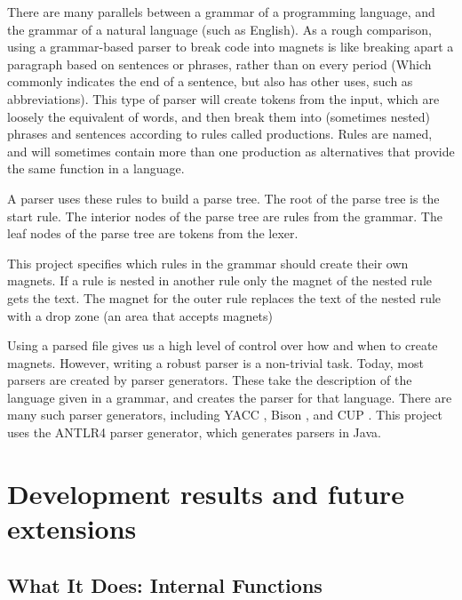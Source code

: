 \documentclass[letter,10pt]{article}
\begin{document}
There are many parallels between a grammar of a programming language, 
and the grammar of a natural language (such as English). 
As a rough comparison, using a grammar-based parser to 
break code into magnets is like breaking apart a paragraph based on 
sentences or phrases, rather than on every period (Which commonly 
indicates the end of a sentence, but also has other uses, such as 
abbreviations). This type of parser will create tokens from the input, 
which are loosely the equivalent of words, and then break them into 
(sometimes nested) phrases and sentences according to rules called 
productions. Rules are named, and will sometimes contain more than one 
production as alternatives that provide the same function in a 
language. 

A parser uses these rules to build a parse tree. The root of the parse 
tree is the start rule. The interior nodes of the parse tree are rules 
from the grammar. The leaf nodes of the parse tree are tokens from the 
lexer.

This project specifies which rules in the grammar should create their 
own magnets. If a rule is nested in another rule only the magnet of the 
nested rule gets the text. The magnet for the outer rule replaces the 
text of the nested rule with a drop zone (an area that accepts magnets)

Using a parsed file gives us a high level of control over how and when
to create magnets. However, writing a robust parser is a non-trivial 
task. Today, most parsers are created by parser generators. These take 
the description of the language given in a grammar, and creates the 
parser for that language. There are many such parser generators, 
including YACC \cite{yacc_homepage}, Bison \cite{bison_homepage}, and 
CUP \cite{cup_homepage}. This project uses the ANTLR4 
\cite{antlr_homepage} parser generator, which generates parsers in 
Java. 


\section{Development results and future extensions}

\subsection{What It Does: Internal Functions}
\end{document}
